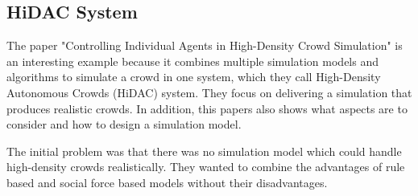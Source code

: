 \documentclass{acmsiggraph}               %
\begin{document}
\subsection{HiDAC System}

The paper "Controlling Individual Agents in High-Density Crowd Simulation" \cite{pelechano_controlling_2007} is an interesting example because it combines multiple simulation models and algorithms to simulate a crowd in one system, which they call High-Density Autonomous Crowds (HiDAC) system. They focus on delivering a simulation that produces realistic crowds.
In addition, this papers also shows what aspects are to consider and how to design a simulation model.

The initial problem was that there was no simulation model which could handle high-density crowds realistically. They wanted to combine the advantages of rule based and social force based models without their disadvantages.
\end{document}
